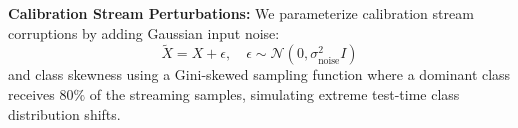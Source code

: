 \textbf{Calibration Stream Perturbations:} We parameterize calibration stream corruptions by adding Gaussian input noise:
\begin{equation}
    \tilde{X} = X + \epsilon, \quad \epsilon \sim \mathcal{N}(0, \sigma^2_{\text{noise}} I)
\end{equation}
and class skewness using a Gini-skewed sampling function where a dominant class receives $80\%$ of the streaming samples, simulating extreme test-time class distribution shifts.
